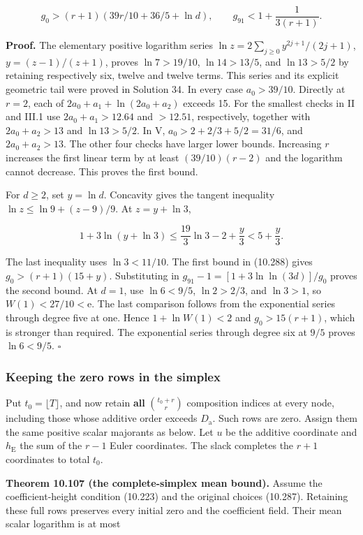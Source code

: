 \documentclass[
  11pt,
  a4paper,
]{article}
\begin{document}
\[
g_0>(r+1)(39r/10+36/5+\ln d),
\qquad
g_{91}<1+\frac1{3(r+1)}.
\tag{10.288}
\]

\textbf{Proof.} The elementary positive logarithm series
\(\ln z=2\sum_{j\ge0}y^{2j+1}/(2j+1)\), \(y=(z-1)/(z+1)\), proves
\(\ln7>19/10\), \(\ln14>13/5\), and \(\ln13>5/2\) by retaining
respectively six, twelve and twelve terms. This series and its explicit
geometric tail were proved in Solution 34. In every case \(a_0>39/10\).
Directly at \(r=2\), each of \(2a_0+a_1+\ln(2a_0+a_2)\) exceeds 15. For
the smallest checks in II and III.1 use \(2a_0+a_1>12.64\) and
\(>12.51\), respectively, together with \(2a_0+a_2>13\) and
\(\ln13>5/2\). In V, \(a_0>2+2/3+5/2=31/6\), and \(2a_0+a_2>13\). The
other four checks have larger lower bounds. Increasing \(r\) increases
the first linear term by at least \((39/10)(r-2)\) and the logarithm
cannot decrease. This proves the first bound.

For \(d\ge2\), set \(y=\ln d\). Concavity gives the tangent inequality
\(\ln z\le\ln9+(z-9)/9\). At \(z=y+\ln3\),

\[
1+3\ln(y+\ln3)
\le\frac{19}{3}\ln3-2+\frac y3
<5+\frac y3.
\]

The last inequality uses \(\ln3<11/10\). The first bound in (10.288)
gives \(g_0>(r+1)(15+y)\). Substituting in
\(g_{91}-1=[1+3\ln\ln(3d)]/g_0\) proves the second bound. At \(d=1\),
use \(\ln6<9/5\), \(\ln2>2/3\), and \(\ln3>1\), so
\(W(1)<27/10<\mathrm e\). The last comparison follows from the
exponential series through degree five at one. Hence \(1+\ln W(1)<2\)
and \(g_0>15(r+1)\), which is stronger than required. The exponential
series through degree six at \(9/5\) proves \(\ln6<9/5\). \(\square\)

\subsubsection{Keeping the zero rows in the
simplex}\label{keeping-the-zero-rows-in-the-simplex}

Put \(t_0=\lfloor T\rfloor\), and now retain \textbf{all}
\(\binom{t_0+r}{r}\) composition indices at every node, including those
whose additive order exceeds \(D_{\mathrm a}\). Such rows are zero.
Assign them the same positive scalar majorants as below. Let \(u\) be
the additive coordinate and \(h_{\mathrm E}\) the sum of the \(r-1\)
Euler coordinates. The slack completes the \(r+1\) coordinates to total
\(t_0\).

\textbf{Theorem 10.107 (the complete-simplex mean bound).} Assume the
coefficient-height condition (10.223) and the original choices (10.287).
Retaining these full rows preserves every initial zero and the
coefficient field. Their mean scalar logarithm is at most
\end{document}
